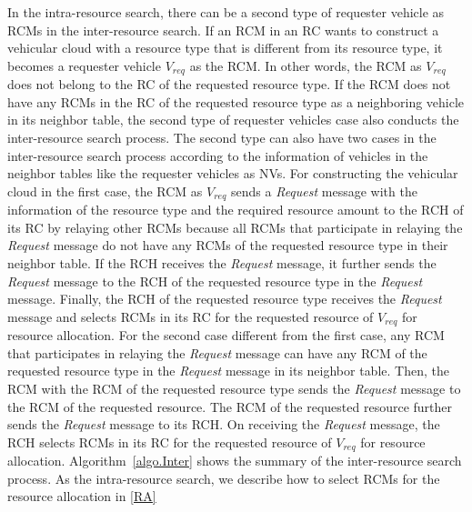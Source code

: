 \documentclass[sensors,article,accept,moreauthors,pdftex]{Definitions/mdpi}
\begin{document}
In the intra-resource search, there can be a second type of requester vehicle as RCMs in the inter-resource search. 
If an RCM in an RC wants to construct a vehicular cloud with a resource type that is different from its resource type, it becomes a requester vehicle $V_{req}$ as the RCM. 
In other words, the RCM as $V_{req}$ does not belong to the RC of the requested resource type. 
If the RCM does not have any RCMs in the RC of the requested resource type as a neighboring vehicle in its neighbor table, the second type of requester vehicles case also conducts the inter-resource search process.
The second type can also have two cases in the inter-resource search process according to the information of vehicles in the neighbor tables like the requester vehicles as NVs.
For constructing the vehicular cloud in the first case, the RCM as $V_{req}$ sends a \textit{Request} message with the information of the resource type and the required resource amount to the RCH of its RC by relaying other RCMs because all RCMs that participate in relaying the \textit{Request} message do not have any RCMs of the requested resource type in their neighbor table. 
If the RCH receives the \textit{Request} message, it further sends the \textit{Request} message to the RCH of the requested resource type in the \textit{Request} message.
Finally, the RCH of the requested resource type receives the \textit{Request} message and selects RCMs in its RC for the requested resource of $V_{req}$ for resource allocation. 
For the second case different from the first case, any RCM that participates in relaying the \textit{Request} message can have any RCM of the requested resource type in the \textit{Request} message in its neighbor table.
Then, the RCM with the RCM of the requested resource type sends the \textit{Request} message to the RCM of the requested resource.
The RCM of the requested resource further sends the \textit{Request} message to its RCH.
On receiving the \textit{Request} message, the RCH selects RCMs in its RC for the requested resource of $V_{req}$ for resource allocation. Algorithm~\ref{algo.Inter} shows the summary of the inter-resource search process. As the intra-resource search, we describe how to select RCMs for the resource allocation in \ref{RA} %
\end{document}
